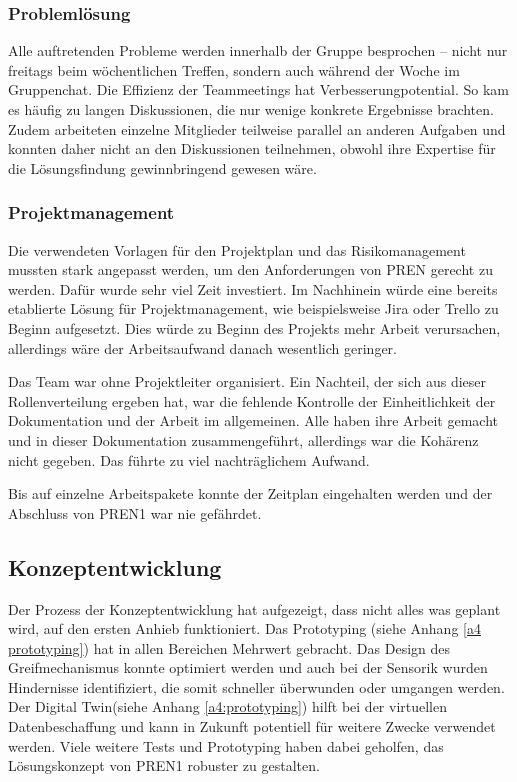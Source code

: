 \documentclass[../main.tex]{subfiles}
\begin{document}
\subsubsection{Problemlösung}
Alle auftretenden Probleme werden innerhalb der Gruppe besprochen – nicht nur freitags beim wöchentlichen Treffen, sondern auch während der Woche im Gruppenchat. Die Effizienz der Teammeetings hat Verbesserungpotential. So kam es häufig zu langen Diskussionen, die nur wenige konkrete Ergebnisse brachten. Zudem arbeiteten einzelne Mitglieder teilweise parallel an anderen Aufgaben und konnten daher nicht an den Diskussionen teilnehmen, obwohl ihre Expertise für die Lösungsfindung gewinnbringend gewesen wäre.

\subsubsection{Projektmanagement}

Die verwendeten Vorlagen für den Projektplan und das Risikomanagement mussten stark angepasst werden, um den Anforderungen von PREN gerecht zu werden. Dafür wurde sehr viel Zeit investiert. Im Nachhinein würde eine bereits etablierte Lösung für Projektmanagement, wie beispielsweise Jira oder Trello zu Beginn aufgesetzt. Dies würde zu Beginn des Projekts mehr Arbeit verursachen, allerdings wäre der Arbeitsaufwand danach wesentlich geringer.

Das Team war ohne Projektleiter organisiert. Ein Nachteil, der sich aus dieser Rollenverteilung ergeben hat, war die fehlende Kontrolle der Einheitlichkeit der Dokumentation und der Arbeit im allgemeinen. Alle haben ihre Arbeit gemacht und in dieser Dokumentation zusammengeführt, allerdings war die Kohärenz nicht gegeben. Das führte zu viel nachträglichem Aufwand.

Bis auf einzelne Arbeitspakete konnte der Zeitplan eingehalten werden und der Abschluss von PREN1 war nie gefährdet.

\subsection{Konzeptentwicklung}

Der Prozess der Konzeptentwicklung hat aufgezeigt, dass nicht alles was geplant wird, auf den ersten Anhieb funktioniert. Das Prototyping (siehe Anhang \ref{a4 prototyping}) hat in allen Bereichen Mehrwert gebracht. Das Design des Greifmechanismus konnte optimiert werden und auch bei der Sensorik wurden Hindernisse identifiziert, die somit schneller überwunden oder umgangen werden. Der Digital Twin(siehe Anhang \ref{a4:prototyping}) hilft bei der virtuellen Datenbeschaffung und kann in Zukunft potentiell für weitere Zwecke verwendet werden. Viele weitere Tests und Prototyping haben dabei geholfen, das Lösungskonzept von PREN1 robuster zu gestalten.
\end{document}
